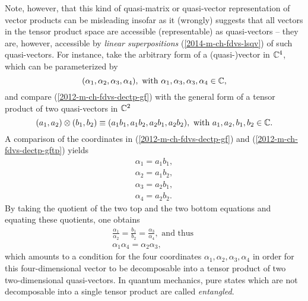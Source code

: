 Note, however, that this kind of quasi-matrix or quasi-vector representation of vector products
can be misleading insofar as
it (wrongly) suggests that all vectors in the tensor product space are accessible (representable) as quasi-vectors
-- they are, however, accessible by {\em linear superpositions} (\ref{2014-m-ch-fdvs-lsqv})
of such quasi-vectors. \label{2012-m-c-fdvs-entanglement}
For instance, take the arbitrary form of a (quasi-)vector in ${\Bbb C}^4$, which can be parameterized by
\begin{equation}
(\alpha_1,\alpha_2,\alpha_3,\alpha_4), \textrm{ with } \alpha_1,\alpha_3,\alpha_3,\alpha_4 \in {\Bbb C},
\label{2012-m-ch-fdvs-dectp-gf}
\end{equation}
and compare (\ref{2012-m-ch-fdvs-dectp-gf}) with the general form of a tensor product of two quasi-vectors in  ${\Bbb C}^2$
\begin{equation}
(a_1,a_2)\otimes (b_1,b_2)\equiv (a_1b_1, a_1 b_2,a_2b_1,a_2b_2), \textrm{ with } a_1,a_2,b_1,b_2\in {\Bbb C}.
\label{2012-m-ch-fdvs-dectp-gftp}
\end{equation}
A comparison of the coordinates in
(\ref{2012-m-ch-fdvs-dectp-gf})
and
(\ref{2012-m-ch-fdvs-dectp-gftp})
yields
\begin{equation}
\begin{split}
\alpha_1=a_1b_1,\\
\alpha_2=a_1b_2,\\
\alpha_3=a_2b_1,\\
\alpha_4=a_2b_2.
\end{split}
\label{2012-m-ch-fdvs-dectp-gftp-a}
\end{equation}
By taking the quotient of the two top and the two bottom equations and equating these quotients, one obtains
\begin{equation}
\begin{split}
\frac{\alpha_1}{\alpha_2}=\frac{b_1}{b_2}
=\frac{\alpha_3}{\alpha_4},\textrm{ and thus }\\
{\alpha_1}{\alpha_4}={\alpha_2}{\alpha_3},
\end{split}
\label{2012-m-ch-fdvs-dectp-gftp-fr}
\end{equation}
which amounts to a condition for the four coordinates  $\alpha_1,\alpha_2,\alpha_3,\alpha_4$
in order for this four-dimensional vector to be decomposable into a tensor product of two two-dimensional quasi-vectors.
In quantum mechanics, pure states which are not decomposable into a single tensor product
are called {\em entangled}.


